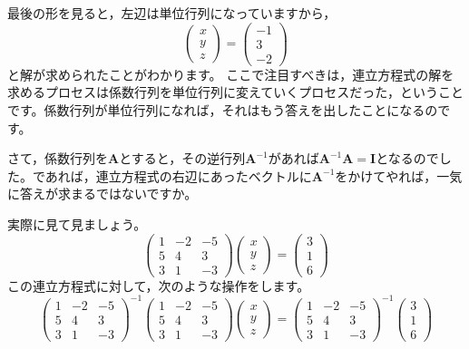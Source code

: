 最後の形を見ると，左辺は単位行列になっていますから，
\[
	\begin{pmatrix}
		x \\
		y \\
		z
	\end{pmatrix}
	=
	\begin{pmatrix}
		-1 \\
		3  \\
		-2
	\end{pmatrix}
\]
と解が求められたことがわかります。
ここで注目すべきは，連立方程式の解を求めるプロセスは係数行列を単位行列に変えていくプロセスだった，ということです。係数行列が単位行列になれば，それはもう答えを出したことになるのです。

さて，係数行列を$\bm{A}$とすると，その逆行列$\bm{A}^{-1}$があれば$\bm{A}^{-1}\bm{A} = \bm{I}$となるのでした。であれば，連立方程式の右辺にあったベクトルに$\bm{A}^{-1}$をかけてやれば，一気に答えが求まるではないですか。

実際に見て見ましょう。
\[
	\begin{pmatrix} 1 & -2 & -5 \\
                5 & 4  & 3  \\
                3 & 1  & -3\end{pmatrix}
	\begin{pmatrix} x \\ y \\ z \end{pmatrix}
	=
	\begin{pmatrix} 3 \\ 1 \\ 6 \end{pmatrix}
\]
この連立方程式に対して，次のような操作をします。
\[
	\begin{pmatrix} 1 & -2 & -5 \\
                5 & 4  & 3  \\
                3 & 1  & -3\end{pmatrix}^{-1}
	\begin{pmatrix} 1 & -2 & -5 \\
                5 & 4  & 3  \\
                3 & 1  & -3\end{pmatrix}
	\begin{pmatrix} x \\ y \\ z \end{pmatrix}
	=
	\begin{pmatrix} 1 & -2 & -5 \\
                5 & 4  & 3  \\
                3 & 1  & -3\end{pmatrix}^{-1}
	\begin{pmatrix} 3 \\ 1 \\ 6 \end{pmatrix}
\]

